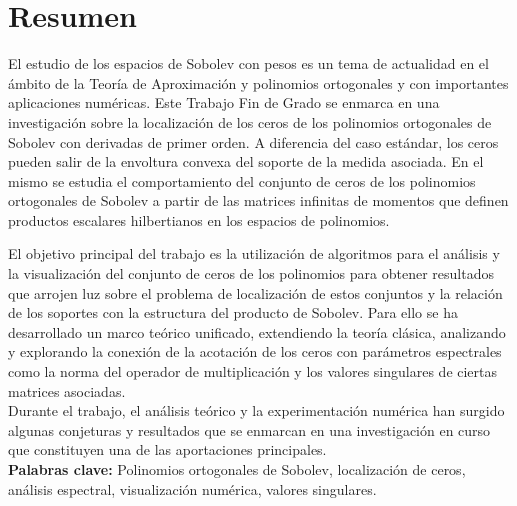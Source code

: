 \chapter*{Resumen}

El estudio de los espacios de Sobolev con pesos es un tema de actualidad en el ámbito de la Teoría de Aproximación y polinomios ortogonales y con importantes aplicaciones numéricas. Este Trabajo Fin de Grado se enmarca en una investigación sobre  la localización de los ceros de los polinomios ortogonales de Sobolev con derivadas de primer orden.  A diferencia del caso estándar,
los ceros pueden salir de la envoltura convexa del soporte de la medida asociada. En el mismo se estudia  el comportamiento  del conjunto de ceros de los polinomios ortogonales de Sobolev  a partir de las matrices infinitas de momentos que definen productos escalares hilbertianos en los espacios de polinomios.

El objetivo principal  del trabajo es la utilización de algoritmos  para el análisis y  la visualización del conjunto de ceros de los polinomios para obtener resultados que arrojen luz sobre el problema de localización de estos conjuntos y  la relación de los soportes con la estructura del producto de Sobolev. Para ello se ha desarrollado un marco teórico unificado, extendiendo la teoría clásica, analizando y explorando  la
conexión de  la acotación de los ceros con  parámetros espectrales como la norma del operador de multiplicación y los valores singulares de ciertas matrices asociadas.\\

Durante el trabajo, el análisis teórico y la experimentación numérica han surgido algunas conjeturas y resultados  que se enmarcan en una  investigación en curso  que constituyen una de las aportaciones principales.\\

\textbf{Palabras clave:} Polinomios ortogonales de Sobolev, localización de ceros, análisis espectral, visualización numérica, valores singulares.


